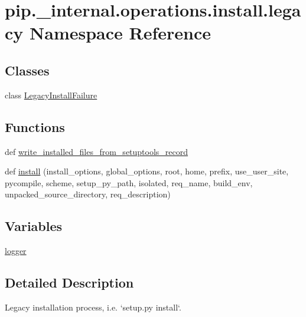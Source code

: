 \hypertarget{namespacepip_1_1__internal_1_1operations_1_1install_1_1legacy}{}\section{pip.\+\_\+internal.\+operations.\+install.\+legacy Namespace Reference}
\label{namespacepip_1_1__internal_1_1operations_1_1install_1_1legacy}
\subsection*{Classes}
\begin{DoxyCompactItemize}
\item 
class \hyperlink{classpip_1_1__internal_1_1operations_1_1install_1_1legacy_1_1LegacyInstallFailure}{Legacy\+Install\+Failure}
\end{DoxyCompactItemize}
\subsection*{Functions}
\begin{DoxyCompactItemize}
\item 
def \hyperlink{namespacepip_1_1__internal_1_1operations_1_1install_1_1legacy_a4ead568179b73f771cbba60fcfa87d51}{write\+\_\+installed\+\_\+files\+\_\+from\+\_\+setuptools\+\_\+record}
\item 
def \hyperlink{namespacepip_1_1__internal_1_1operations_1_1install_1_1legacy_ab710071c8c71980601a4d22a49f61f89}{install} (install\+\_\+options, global\+\_\+options, root, home, prefix, use\+\_\+user\+\_\+site, pycompile, scheme, setup\+\_\+py\+\_\+path, isolated, req\+\_\+name, build\+\_\+env, unpacked\+\_\+source\+\_\+directory, req\+\_\+description)
\end{DoxyCompactItemize}
\subsection*{Variables}
\begin{DoxyCompactItemize}
\item 
\hyperlink{namespacepip_1_1__internal_1_1operations_1_1install_1_1legacy_ab5c7910a5b4f6b7fbf2214e454b27ba0}{logger}
\end{DoxyCompactItemize}


\subsection{Detailed Description}
\begin{DoxyVerb}Legacy installation process, i.e. `setup.py install`.
\end{DoxyVerb}
 

